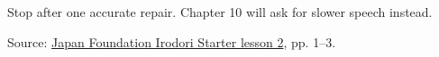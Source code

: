 \begin{tcolorbox}[breakable,colback=teal!4,colframe=teal!35!black,title={Before you move on}]
Stop after one accurate repair. Chapter 10 will ask for slower speech instead.

Source: \href{https://www.irodori.jpf.go.jp/assets/data/starter/pdf/X\_L02.pdf}{Japan Foundation Irodori Starter lesson 2}, pp. 1–3.
\end{tcolorbox}
